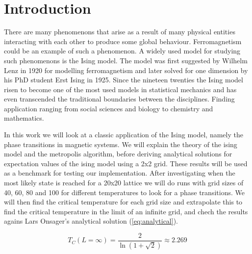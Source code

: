 \section{Introduction}
There are many phenomenons that arise as a result of many physical entities
interacting with each other to produce some global behaviour.
Ferromagnetism could be an example of such a phenomenon. A widely used model for
studying such phenomenons is the Ising model.
The model was first suggested by Wilhelm Lenz in 1920 for modelling ferromagnetism and later solved
for one dimension by his PhD student Erst Ising in 1925. Since the nineteen
twenties the Ising model risen to become one of the most used models in
statistical mechanics and has even
transcended the traditional boundaries between the disciplines. Finding
application ranging from social sciences and biology to chemistry and
mathematics.

In this work we will look at a classic application of the Ising model, namely
the phase transitions in magnetic systems.
We will explain the theory of the ising model and the metropolis algorithm,
before deriving analytical solutions for expectation values of the ising
model using a 2x2 grid. These results will be used as a benchmark for testing
our implementation. After investigating when the most likely state is reached
for a 20x20 lattice we will do runs with grid sizes of 40, 60, 80 and 100
for different temperatures to look for a phase transitions.
We will then find the critical temperature for each grid size and extrapolate
this to find the critical temperature in the limit of an infinite grid, and
chech the results agains Lars Onsager's analytical solution (\cref{eq:analytical}).

\begin{equation}
  \label{eq:analytical}
  T_C(L=\infty) = \frac{2}{\ln(1 + \sqrt2)} \approx 2.269
\end{equation}



